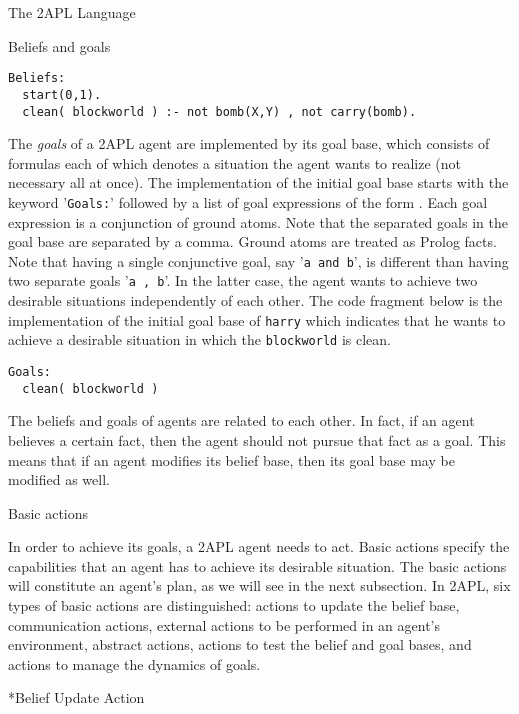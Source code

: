 \begin{chapter}{The 2APL Language}
\begin{section}{Beliefs and goals}
\begin{verbatim}
Beliefs:
  start(0,1).
  clean( blockworld ) :- not bomb(X,Y) , not carry(bomb).
\end{verbatim}

The \emph{goals} of a 2APL agent are implemented by its goal base,
which consists of formulas each of which denotes a situation the
agent wants to realize (not necessary all at once). The
implementation of the initial goal base starts with the keyword
'{\tt Goals:}' followed by a list of goal expressions of the form
. Each goal expression is a conjunction of ground atoms.
Note that the separated goals in the goal base are separated by a
comma. Ground atoms are treated as Prolog facts. Note that having a
single conjunctive goal, say '{\tt a and b}', is different than
having two separate goals '{\tt a , b}'. In the latter case, the
agent wants to achieve two desirable situations independently of
each other. The code fragment below is the implementation of the
initial goal base of {\tt harry} which indicates that he wants to
achieve a desirable situation in which the {\tt blockworld} is
clean.

\begin{verbatim}
Goals:
  clean( blockworld )
\end{verbatim}

The beliefs and goals of agents are related to each other. In fact,
if an agent believes a certain fact, then the agent should not
pursue that fact as a goal. This means that if an agent modifies its
belief base, then its goal base may be modified as well.
\end{section}


\begin{section}{Basic actions}

In order to achieve its goals, a 2APL agent needs to act. Basic
actions specify the capabilities that an agent has to achieve its
desirable situation. The basic actions will constitute an agent's
plan, as we will see in the next subsection. In 2APL, six types of
basic actions are distinguished: actions to update the belief base,
communication actions, external actions to be performed in an
agent's environment, abstract actions, actions to test the belief
and goal bases, and actions to manage the dynamics of goals.

\begin{subsection}*{Belief Update Action}


\end{subsection}
\end{section}
\end{chapter}
